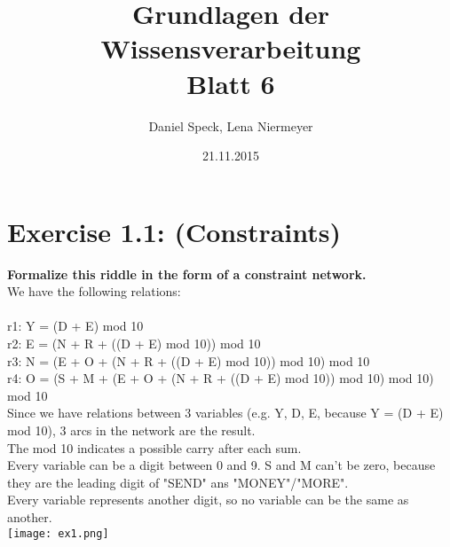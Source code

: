 \documentclass[10pt,a4paper]{article}
\title{\textbf{\huge Grundlagen der Wissensverarbeitung
		\\\Large Blatt 6}}
\author{Daniel Speck, Lena Niermeyer}
\date{21.11.2015}
\begin{document}
		
	\maketitle
		
	\section*{Exercise 1.1: (Constraints)}
	

\textbf{Formalize this riddle in the form of a constraint network.}
\\
We have the following relations:
\\\\
r1: Y = (D + E) mod 10 \\
r2: E = (N + R + ((D + E) mod 10)) mod 10 \\
r3: N = (E + O + (N + R + ((D + E) mod 10)) mod 10) mod 10 \\
r4: O = (S + M + (E + O + (N + R + ((D + E) mod 10)) mod 10) mod 10) mod 10 \\

\noindent Since we have relations between 3 variables (e.g. Y, D, E, because Y = (D + E) mod 10), 3 arcs in the network are the result. \\
The mod 10 indicates a possible carry after each sum. \\
Every variable can be a digit between 0 and 9. S and M can't be zero, because they are the leading digit of "SEND" ans "MONEY"/"MORE". \\
Every variable represents another digit, so no variable can be the same as another. \\




	\noindent
	\texttt{[image: ex1.png]} \\
	
	
\end{document}
